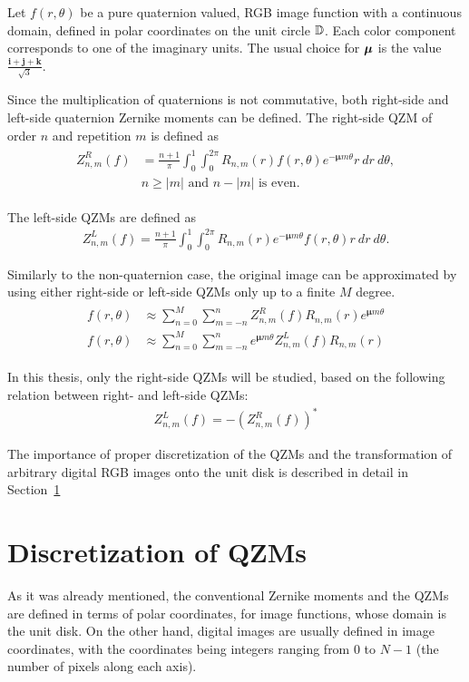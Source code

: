 Let $f(r,\theta)$ be a pure quaternion valued, RGB image function with a continuous domain, defined in polar coordinates on the unit circle $\mathbb{D}$. Each color component corresponds to one of the imaginary units. The usual choice for $\boldsymbol{\mu}$ is the value $\frac{\mathbf{i} + \mathbf{j} + \mathbf{k}}{\sqrt{3}}$.

Since the multiplication of quaternions is not commutative, both right-side and left-side quaternion Zernike moments can be defined. The right-side QZM of order $n$ and repetition $m$ is defined as
\begin{gather}
  \begin{split}
  Z_{n,m}^R(f) &= \frac{n + 1}{\pi}\int_0^1\int_0^{2\pi}R_{n,m}(r)f(r,\theta)e^{-\bm{\mu}m\theta}r\ dr\ d\theta, \\
  &n \geq |m| \text{  and  } n - |m| \text{  is even.}
  \end{split}
  \label{eq:QZRM}
\end{gather}

The left-side QZMs are defined as 
\begin{gather*}
  Z_{n,m}^L(f) = \frac{n + 1}{\pi}\int_0^1\int_0^{2\pi}R_{n,m}(r)e^{-\bm{\mu}m\theta}f(r,\theta)r\ dr\ d\theta.
\end{gather*}

Similarly to the non-quaternion case, the original image can be approximated by using either right-side or left-side QZMs only up to a finite $M$ degree.
\begin{gather}
\begin{split}
  f(r,\theta) &\approx \sum_{n=0}^{M}\sum_{m=-n}^{n}Z_{n,m}^R(f)R_{n,m}(r)e^{\bm{\mu}m\theta} \\
  f(r,\theta) &\approx \sum_{n=0}^{M}\sum_{m=-n}^{n}e^{\bm{\mu}m\theta}Z_{n,m}^L(f)R_{n,m}(r)
\end{split}\label{eq:qzm_reconstruction}
\end{gather}

In this thesis, only the right-side QZMs will be studied, based on the following relation between right- and left-side QZMs:
\begin{gather*}
  Z_{n,m}^L(f) = -(Z_{n,m}^R(f))^{*}
\end{gather*}

The importance of proper discretization of the QZMs and the transformation of arbitrary digital RGB images onto the unit disk is described in detail in Section~\ref{sec:discretization} 

\section{Discretization of QZMs}\label{sec:discretization}
As it was already mentioned, the conventional Zernike moments and the QZMs are defined in terms of polar coordinates, for image functions, whose domain is the unit disk. On the other hand, digital images are usually defined in image coordinates, with the coordinates being integers ranging from $0$ to $N - 1$ (the number of pixels along each axis).

